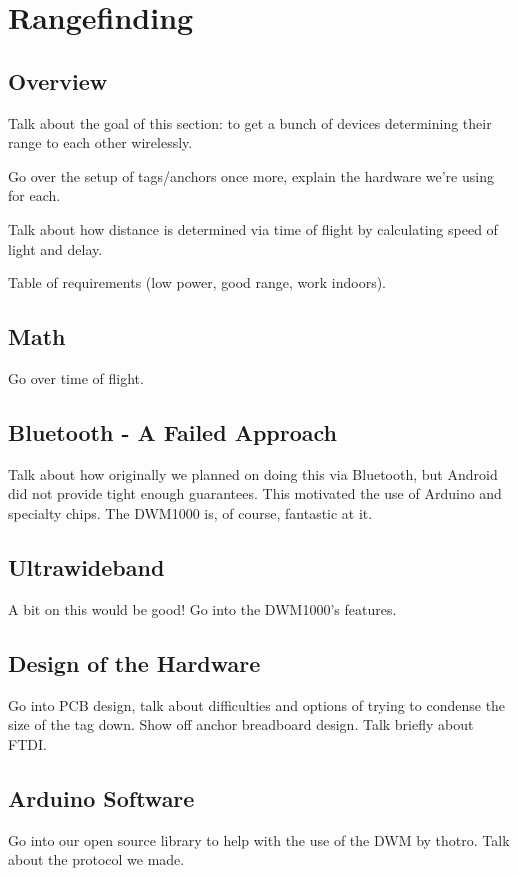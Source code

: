 
\chapter{Rangefinding} %

\label{Rangefinding}


\section{Overview}
Talk about the goal of this section: to get a bunch of devices determining their range to each other wirelessly.

Go over the setup of tags/anchors once more, explain the hardware we're using for each.

Talk about how distance is determined via time of flight by calculating speed of light and delay.

Table of requirements (low power, good range, work indoors).

\section{Math}
Go over time of flight.

\section{Bluetooth - A Failed Approach}
Talk about how originally we planned on doing this via Bluetooth, but Android did not provide tight enough guarantees. This motivated the use of Arduino and specialty chips. The DWM1000 is, of course, fantastic at it.

\section{Ultrawideband}
A bit on this would be good! Go into the DWM1000's features.

\section{Design of the Hardware}
Go into PCB design, talk about difficulties and options of trying to condense the size of the tag down. Show off anchor breadboard design. Talk briefly about FTDI.

\section{Arduino Software}
Go into our open source library to help with the use of the DWM by thotro. Talk about the protocol we made.

